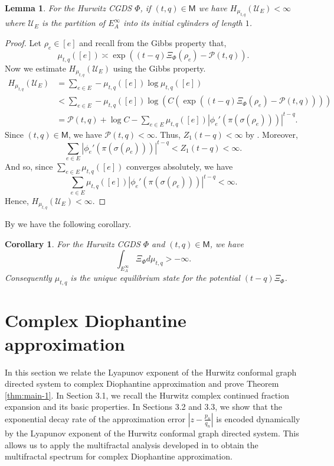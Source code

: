 \documentclass[11pt]{amsart}
\theoremstyle{plain}
\newtheorem{corollary}[theorem]{Corollary}
\newtheorem{lemma}[theorem]{Lemma}
\theoremstyle{definition}
\renewcommand\~{\tilde}%
\numberwithin{equation}{section}
\begin{document}
\begin{lemma}\label{lem:cylEntropy}
    For the Hurwitz CGDS $\Phi$, if $(t,q)\in \mathsf{M}$ we have $H_{\mu_{t,q}}(\mathcal{U}_E)<\infty$ where $\mathcal{U}_E$ is the partition of $E_A^{\infty}$ into its initial cylinders of length $1$. 
\end{lemma}

\begin{proof}
Let $\rho_e\in[e]$ and recall from the Gibbs property that,
    $$
        \mu_{t,q}([e])\asymp\exp((t-q)\Xi_{\Phi}(\rho_e)-\mathcal P(t,q)).
    $$
    Now we estimate $H_{\mu_{t,q}}(\mathcal{U}_E)$ using the Gibbs property.
    \begin{align*}
        H_{\mu_{t,q}}(\mathcal{U}_E) &= \sum_{e\in E}-\mu_{t,q}([e])\log\mu_{t,q}([e])\\
        &< \sum_{e\in E}-\mu_{t,q}([e])\log(C(\exp((t-q)\Xi_{\Phi}(\rho_e)-\mathcal P(t,q))))\\
        &=\mathcal P(t,q)+\log C-\sum_{e\in E} \mu_{t,q}([e])|\phi_{e}'(\pi(\sigma(\rho_e)))|^{t-q}.
    \end{align*}
    Since $(t,q)\in \mathsf{M}$, we have $\mathcal P(t,q)<\infty$. Thus, $Z_1(t-q)<\infty$ by \cite[Proposition 19.4.5]{Urbanski22}. Moreover,
    $$
    \sum_{e\in E}|\phi_{e}'(\pi(\sigma(\rho_e)))|^{t-q}<Z_1(t-q)<\infty.
    $$
    And so, since $\sum_{e\in E}\mu_{t,q}([e])$ converges absolutely, we have 
    $$
    \sum_{e\in E}\mu_{t,q}([e])|\phi_{e}'(\pi(\sigma(\rho_e)))|^{t-q}<\infty.
    $$
    Hence, $H_{\mu_{t,q}}(\mathcal{U}_E)<\infty$.
    
\end{proof}

By \cite[Theorem 17.4.7 and Theorem 17.5.1]{Urbanski22} we have the following corollary.

\begin{corollary}\label{cor:int}
    For the Hurwitz CGDS $\Phi$ and $(t,q)\in \mathsf{M}$, we have
    $$
        \int_{E_A^{\infty}}\Xi_{\Phi}d\mu_{t,q}>-\infty.
    $$
    Consequently $\mu_{t,q}$ is the unique equilibrium state for the potential $(t-q)\Xi_{\Phi}$.
\end{corollary}


\section{Complex Diophantine approximation}
In this section we relate the Lyapunov exponent of the Hurwitz conformal graph directed system to complex Diophantine approximation and prove Theorem \ref{thm:main-1}. In Section 3.1, 
we recall the Hurwitz complex continued fraction expansion and its basic properties. In Sections 3.2 and 3.3, we show that the exponential decay rate of the approximation error $\left|z-\frac{p_n}{q_n}\right|$ is encoded dynamically by the Lyapunov exponent of the Hurwitz conformal graph directed system. 
This allows us to apply the multifractal analysis developed in \cite{NDDis} to obtain the multifractal spectrum for complex Diophantine approximation.
\end{document}
